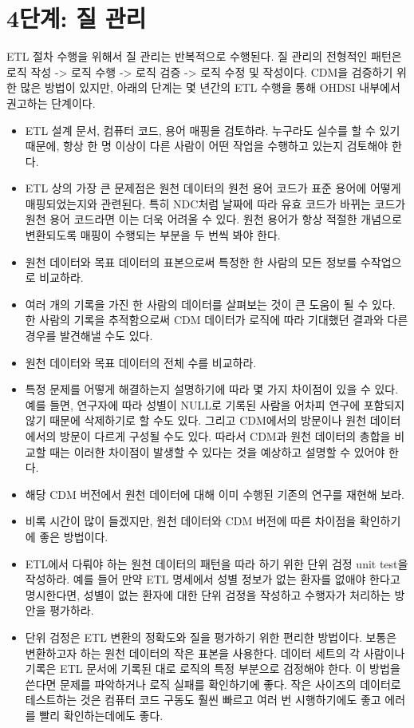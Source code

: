 \documentclass[10.5pt]{book}
\providecommand{\tightlist}{%
  \setlength{\itemsep}{0pt}\setlength{\parskip}{0pt}}
\theoremstyle{definition}
\theoremstyle{definition}
\theoremstyle{definition}
\theoremstyle{remark}
\begin{document}
\section{4단계: 질 관리}\label{--}

ETL 절차 수행을 위해서 질 관리는 반복적으로 수행된다. 질 관리의 전형적인
패턴은 로직 작성 -\textgreater{} 로직 수행 -\textgreater{} 로직 검증
-\textgreater{} 로직 수정 및 작성이다. CDM을 검증하기 위한 많은 방법이
있지만, 아래의 단계는 몇 년간의 ETL 수행을 통해 OHDSI 내부에서 권고하는
단계이다. 

\begin{itemize}
\tightlist
\item
  ETL 설계 문서, 컴퓨터 코드, 용어 매핑을 검토하라. 누구라도 실수를 할
  수 있기 때문에, 항상 한 명 이상이 다른 사람이 어떤 작업을 수행하고
  있는지 검토해야 한다.
\item
  ETL 상의 가장 큰 문제점은 원천 데이터의 원천 용어 코드가 표준 용어에
  어떻게 매핑되었는지와 관련된다. 특히 NDC처럼 날짜에 따라 유효 코드가
  바뀌는 코드가 원천 용어 코드라면 이는 더욱 어려울 수 있다. 원천 용어가
  항상 적절한 개념으로 변환되도록 매핑이 수행되는 부분을 두 번씩 봐야
  한다.
\item
  원천 데이터와 목표 데이터의 표본으로써 특정한 한 사람의 모든 정보를
  수작업으로 비교하라.
\item
  여러 개의 기록을 가진 한 사람의 데이터를 살펴보는 것이 큰 도움이 될 수
  있다. 한 사람의 기록을 추적함으로써 CDM 데이터가 로직에 따라 기대했던
  결과와 다른 경우를 발견해낼 수도 있다.
\item
  원천 데이터와 목표 데이터의 전체 수를 비교하라.
\item
  특정 문제를 어떻게 해결하는지 설명하기에 따라 몇 가지 차이점이 있을 수
  있다. 예를 들면, 연구자에 따라 성별이 NULL로 기록된 사람을 어차피
  연구에 포함되지 않기 때문에 삭제하기로 할 수도 있다. 그리고 CDM에서의
  방문이나 원천 데이터에서의 방문이 다르게 구성될 수도 있다. 따라서
  CDM과 원천 데이터의 총합을 비교할 때는 이러한 차이점이 발생할 수
  있다는 것을 예상하고 설명할 수 있어야 한다.
\item
  해당 CDM 버전에서 원천 데이터에 대해 이미 수행된 기존의 연구를 재현해
  보라.
\item
  비록 시간이 많이 들겠지만, 원천 데이터와 CDM 버전에 따른 차이점을
  확인하기에 좋은 방법이다.
\item
  ETL에서 다뤄야 하는 원천 데이터의 패턴을 따라 하기 위한 단위 검정 unit
  test을 작성하라. 예를 들어 만약 ETL 명세에서 성별 정보가 없는 환자를
  없애야 한다고 명시한다면, 성별이 없는 환자에 대한 단위 검정을 작성하고
  수행자가 처리하는 방안을 평가하라.
\item
  단위 검정은 ETL 변환의 정확도와 질을 평가하기 위한 편리한 방법이다.
  보통은 변환하고자 하는 원천 데이터의 작은 표본을 사용한다. 데이터
  세트의 각 사람이나 기록은 ETL 문서에 기록된 대로 로직의 특정 부분으로
  검정해야 한다. 이 방법을 쓴다면 문제를 파악하거나 로직 실패를
  확인하기에 좋다. 작은 사이즈의 데이터로 테스트하는 것은 컴퓨터 코드
  구동도 훨씬 빠르고 여러 번 시행하기에도 좋고 에러를 빨리
  확인하는데에도 좋다.
\end{itemize}
\end{document}
